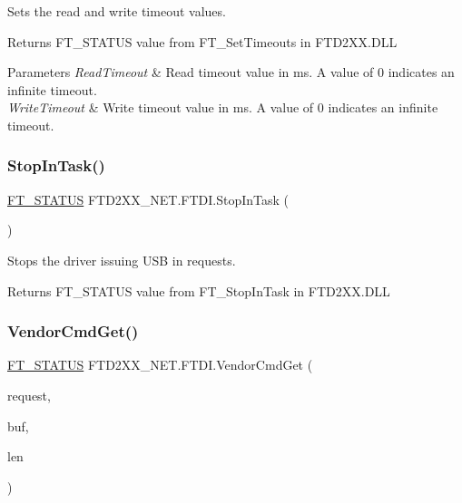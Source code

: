 Sets the read and write timeout values. 

\begin{DoxyReturn}{Returns}
F\+T\+\_\+\+S\+T\+A\+T\+US value from F\+T\+\_\+\+Set\+Timeouts in F\+T\+D2\+X\+X.\+D\+LL
\end{DoxyReturn}

\begin{DoxyParams}{Parameters}
{\em Read\+Timeout} & Read timeout value in ms. A value of 0 indicates an infinite timeout.\\
\hline
{\em Write\+Timeout} & Write timeout value in ms. A value of 0 indicates an infinite timeout.\\
\hline
\end{DoxyParams}
\mbox{\label{class_f_t_d2_x_x___n_e_t_1_1_f_t_d_i_a2ec9e4bd045d229e510157d715645749}} 
\subsubsection{\texorpdfstring{StopInTask()}{StopInTask()}}
{\footnotesize\ttfamily \mbox{\hyperlink{class_f_t_d2_x_x___n_e_t_1_1_f_t_d_i_aabe20ad905cc4ccc1e35dd5b877d9a83}{F\+T\+\_\+\+S\+T\+A\+T\+US}} F\+T\+D2\+X\+X\+\_\+\+N\+E\+T.\+F\+T\+D\+I.\+Stop\+In\+Task (\begin{DoxyParamCaption}{ }\end{DoxyParamCaption})}



Stops the driver issuing U\+SB in requests. 

\begin{DoxyReturn}{Returns}
F\+T\+\_\+\+S\+T\+A\+T\+US value from F\+T\+\_\+\+Stop\+In\+Task in F\+T\+D2\+X\+X.\+D\+LL
\end{DoxyReturn}
\mbox{\label{class_f_t_d2_x_x___n_e_t_1_1_f_t_d_i_a9acbc4c54ca25e1281acb499e2df6b32}} 
\subsubsection{\texorpdfstring{VendorCmdGet()}{VendorCmdGet()}}
{\footnotesize\ttfamily \mbox{\hyperlink{class_f_t_d2_x_x___n_e_t_1_1_f_t_d_i_aabe20ad905cc4ccc1e35dd5b877d9a83}{F\+T\+\_\+\+S\+T\+A\+T\+US}} F\+T\+D2\+X\+X\+\_\+\+N\+E\+T.\+F\+T\+D\+I.\+Vendor\+Cmd\+Get (\begin{DoxyParamCaption}\item[{U\+Int16}]{request,  }\item[{byte \mbox{[}$\,$\mbox{]}}]{buf,  }\item[{U\+Int16}]{len }\end{DoxyParamCaption})}



